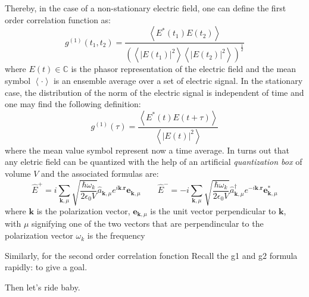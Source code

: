 \documentclass[12pt]{report}
\begin{document}
Thereby, in the case of a non-stationary electric field, one can define the first order correlation function as:
\begin{equation}
{\displaystyle g ^{(1)}(t_{1},t_{2})={\frac {\left\langle E^{*}(t_{1})E(t_{2})\right\rangle }{\left(\left\langle \left|E(t_{1})\right|^{2}\right\rangle \left\langle \left|E(t_{2})\right|^{2}\right\rangle \right)^{\frac {1}{2}}}}}
\end{equation}
where $E(t) \in \mathbb{C}$ is the phasor representation of the electric field and the mean symbol $\left\langle \cdot \right\rangle$ is an ensemble average over a set of electric signal. In the stationary case, the distribution of the norm of the electric signal is independent of time and one may find the following definition:
\begin{equation}
{\displaystyle g ^{(1)}(\tau )={\frac {\left\langle E^{*}(t)E(t+\tau )\right\rangle }{\left\langle \left|E(t)\right|^{2}\right\rangle }}}
\end{equation}
where the mean value symbol represent now a time average.
In turns out that any eletric field can be quantized  with the help of an artificial \textit{quantization box} of volume $V$ and the associated formulas are:
\begin{equation}
{\displaystyle {\hat {E}}^{+}=i\sum \limits _{\mathbf {k} ,\mu }{\sqrt {\frac {\hbar \omega _{k}}{2\epsilon _{0}V}}}{\hat {a}}_{\mathbf {k} ,\mu }e^{i\mathbf {k} .\mathbf {r} }\mathbf {e} _{\mathbf {k} ,\mu }} \quad \quad {\displaystyle {\hat {E}}^{-}=-i\sum \limits _{\mathbf {k} ,\mu }{\sqrt {\frac {\hbar \omega _{k}}{2\epsilon _{0}V}}}{\hat {a}}^\dagger_{\mathbf {k} ,\mu }e^{-i\mathbf {k} .\mathbf {r} }\mathbf {e}^* _{\mathbf {k} ,\mu }}
\end{equation}
where 
${\displaystyle \mathbf {k} }$ is the polarization vector, 
${\displaystyle \mathbf {e} _{\mathbf {k} ,\mu }}$ is the unit vector perpendicular to 
${\displaystyle \mathbf {k} }$, with 
${\displaystyle \mu }$ signifying one of the two vectors that are perpendincular to the polarization vector
${\displaystyle \omega _{k}}$ is the frequency

Similarly, for the second order correlation fonction
Recall the g1 and g2 formula rapidly: to give a goal.

Then let's ride baby.
\end{document}
